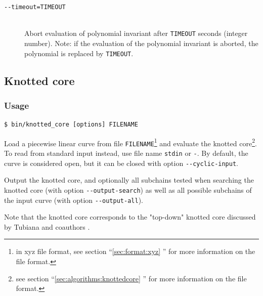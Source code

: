 \begin{description}
\item[\lstinline{--timeout=TIMEOUT}]\hfill\\
  Abort evaluation of polynomial invariant after \lstinline{TIMEOUT} seconds (integer number). Note: if the evaluation of the polynomial invariant is aborted, the polynomial is replaced by \lstinline{TIMEOUT}.
\end{description}


      
\subsection{Knotted core}
\subsubsection{Usage}
\begin{lstlisting}
$ bin/knotted_core [options] FILENAME
\end{lstlisting}

Load a piecewise linear curve from file  \lstinline{FILENAME}\footnote{in xyz file format, see section ``\ref{sec:format:xyz} ''  for more information on the file format.} and evaluate the knotted core\footnote{see section  ``\ref{sec:algorithms:knottedcore} '' for more information on the file format.}.
To read from standard input instead, use file name \lstinline{stdin} or \lstinline{-}.
By default, the curve is considered open, but it can be closed with option \lstinline{--cyclic-input}.

Output the knotted core,  and optionally all subchains tested when searching the knotted core (with option \lstinline{--output-search}) as well as all possible subchains of the input curve (with option \lstinline{--output-all}).

Note that the knotted core corresponds to the "top-down" knotted core discussed by Tubiana and coauthors \cite{tubiana2011}.


